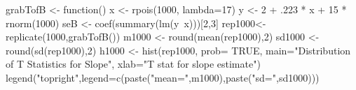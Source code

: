 \begin{Schunk}
\begin{Sinput}
  grabTofB <- function(){
      x <- rpois(1000, lambda=17)
      y <- 2 + .223 * x + 15 * rnorm(1000)
      seB <- coef(summary(lm(y~x)))[2,3]
  }
  rep1000<- replicate(1000,grabTofB())
  m1000 <- round(mean(rep1000),2)
  sd1000 <- round(sd(rep1000),2)
  h1000 <- hist(rep1000, prob= TRUE, main="Distribution of T Statistics for Slope", xlab="T stat for slope estimate")
  legend("topright",legend=c(paste("mean=",m1000),paste("sd=",sd1000)))
\end{Sinput}
\end{Schunk}
